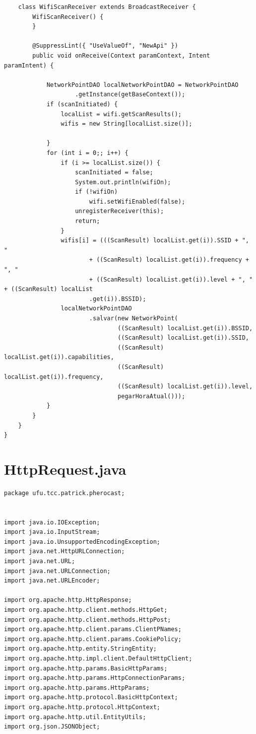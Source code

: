\documentclass[12pt, %
openright, 
oneside,
a4paper,
brazil]{facom-ufu-abntex2}
\begin{document}
\begin{anexosenv}
\begin{lstlisting}
	class WifiScanReceiver extends BroadcastReceiver {
		WifiScanReceiver() {
		}

		@SuppressLint({ "UseValueOf", "NewApi" })
		public void onReceive(Context paramContext, Intent paramIntent) {

			NetworkPointDAO localNetworkPointDAO = NetworkPointDAO
					.getInstance(getBaseContext());
			if (scanInitiated) {
				localList = wifi.getScanResults();
				wifis = new String[localList.size()];

			}
			for (int i = 0;; i++) {
				if (i >= localList.size()) {
					scanInitiated = false;
					System.out.println(wifiOn);
					if (!wifiOn)
						wifi.setWifiEnabled(false);
					unregisterReceiver(this);
					return;
				}
				wifis[i] = (((ScanResult) localList.get(i)).SSID + ", "
						+ ((ScanResult) localList.get(i)).frequency + ", "
						+ ((ScanResult) localList.get(i)).level + ", " + ((ScanResult) localList
						.get(i)).BSSID);
				localNetworkPointDAO
						.salvar(new NetworkPoint(
								((ScanResult) localList.get(i)).BSSID,
								((ScanResult) localList.get(i)).SSID,
								((ScanResult) localList.get(i)).capabilities,
								((ScanResult) localList.get(i)).frequency,
								((ScanResult) localList.get(i)).level,
								pegarHoraAtual()));
			}
		}
	}
}
\end{lstlisting}
\section{HttpRequest.java}
\begin{lstlisting}
package ufu.tcc.patrick.pherocast;


import java.io.IOException;
import java.io.InputStream;
import java.io.UnsupportedEncodingException;
import java.net.HttpURLConnection;
import java.net.URL;
import java.net.URLConnection;
import java.net.URLEncoder;

import org.apache.http.HttpResponse;
import org.apache.http.client.methods.HttpGet;
import org.apache.http.client.methods.HttpPost;
import org.apache.http.client.params.ClientPNames;
import org.apache.http.client.params.CookiePolicy;
import org.apache.http.entity.StringEntity;
import org.apache.http.impl.client.DefaultHttpClient;
import org.apache.http.params.BasicHttpParams;
import org.apache.http.params.HttpConnectionParams;
import org.apache.http.params.HttpParams;
import org.apache.http.protocol.BasicHttpContext;
import org.apache.http.protocol.HttpContext;
import org.apache.http.util.EntityUtils;
import org.json.JSONObject;


\end{lstlisting}
\end{anexosenv}
\end{document}
